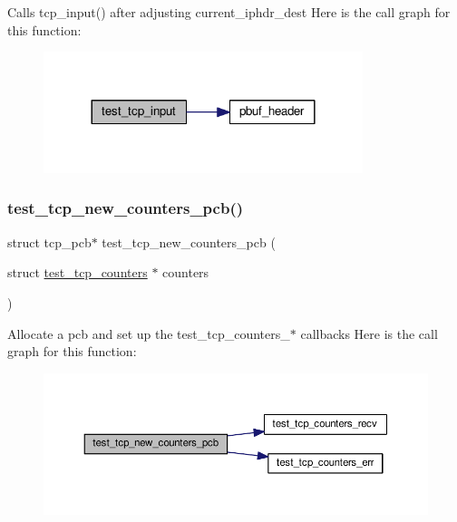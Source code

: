 Calls tcp\+\_\+input() after adjusting current\+\_\+iphdr\+\_\+dest Here is the call graph for this function\+:
\nopagebreak
\begin{figure}[H]
\begin{center}
\leavevmode
\includegraphics[width=264pt]{openmote-cc2538_2lwip_2test_2unit_2tcp_2tcp__helper_8c_a310f0aa8ac7ce26d35fd91c69ff98bda_cgraph}
\end{center}
\end{figure}
\mbox{\label{openmote-cc2538_2lwip_2test_2unit_2tcp_2tcp__helper_8c_a4743f4d8687063a2fc6da6d448cfcdcf}} 
\subsubsection{\texorpdfstring{test\+\_\+tcp\+\_\+new\+\_\+counters\+\_\+pcb()}{test\_tcp\_new\_counters\_pcb()}}
{\footnotesize\ttfamily struct tcp\+\_\+pcb$\ast$ test\+\_\+tcp\+\_\+new\+\_\+counters\+\_\+pcb (\begin{DoxyParamCaption}\item[{struct \hyperlink{structtest__tcp__counters}{test\+\_\+tcp\+\_\+counters} $\ast$}]{counters }\end{DoxyParamCaption})}

Allocate a pcb and set up the test\+\_\+tcp\+\_\+counters\+\_\+$\ast$ callbacks Here is the call graph for this function\+:
\nopagebreak
\begin{figure}[H]
\begin{center}
\leavevmode
\includegraphics[width=350pt]{openmote-cc2538_2lwip_2test_2unit_2tcp_2tcp__helper_8c_a4743f4d8687063a2fc6da6d448cfcdcf_cgraph}
\end{center}
\end{figure}
